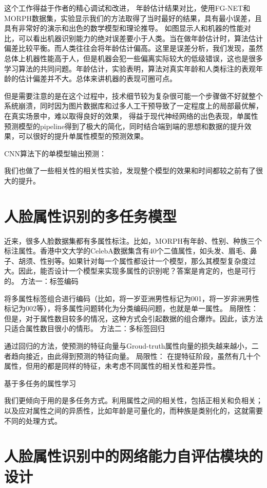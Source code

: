 这个工作得益于作者的精心调试和改进，
年龄估计结果对比，使用FG-NET和MORPH数据集，实验显示我们的方法取得了当时最好的结果，具有最小误差，且具有非常好的演示和出色的数学模型和理论推导。
如图显示人和机器的性能对比，可以看出机器识别能力的绝对误差要小于人类。当在做年龄估计时，算法估计偏差比较平衡。而人类往往会将年龄估计偏高。这里是误差分析，我们发现，虽然总体上机器性能高于人，但是机器会犯一些偏离实际较大的低级错误，这也是很多学习算法的共同问题。年龄估计，实验表明，算法对真实年龄和人类标注的表观年龄的估计偏差并不大。总体来讲机器的表现可圈可点。

但是需要注意的是在这个过程中，技术细节较为复杂很可能一个步骤做不好就整个系统崩溃，同时因为图片数据库和过多人工干预导致了一定程度上的局部最优解，在真实场景中，难以取得良好的效果，
得益于现代神经网络的出色表现，单属性预测模型的pipeline得到了极大的简化，同时结合端到端的思想和数据的提升效果，可以很好的提升单属性模型的预测效果。

CNN算法下的单模型输出预测：


我们也做了一些相关性的相关性实验，发现整个模型的效果和时间都较之前有了很大的提升。




\section{人脸属性识别的多任务模型}
近来，很多人脸数据集都有多属性标注。比如，MORPH有年龄、性别、种族三个标注属性。香港中文大学的CelebA数据集含有40个二值属性，如头发、眉毛、鼻子、胡须、性别等。如果针对每一个属性都设计一个模型，那么其模型复杂度过大。因此，能否设计一个模型来实现多属性的识别呢？答案是肯定的，也是可行的。
方法一：标签编码

将多属性标签组合进行编码（比如，将一岁亚洲男性标记为001，将一岁非洲男性标记为002等），将多属性问题转化为分类编码问题，也就是单一属性。
局限性：
但是，对于属性数目较多的情况，这种方式会引起数据的组合爆炸。因此，该方法只适合属性数目很小的情形。
方法二：多标签回归

通过回归的方法，使预测的特征向量与Groud-truth属性向量的损失越来越小，二者趋向接近，由此得到预测的特征向量。
局限性：
在提特征阶段，虽然有几十个属性，但用的都是同样的特征，未考虑不同属性的相关性和差异性。

基于多任务的属性学习

我们更倾向于用的是多任务方式。利用属性之间的相关性，包括正相关和负相关；以及应对属性之间的异质性，比如年龄是可量化的，而种族是类别化的，这就需要不同的处理方式。



\section{人脸属性识别中的网络能力自评估模块的设计}

